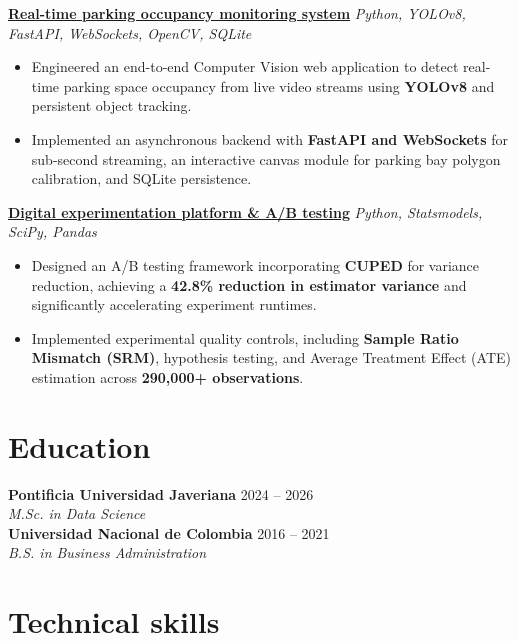 \documentclass[letterpaper,10pt]{article}
\begin{document}
\textbf{\href{https://cveram96.github.io/Portfolio/parkvision.html}{Real-time parking occupancy monitoring system}} \hfill \small{\textit{Python, YOLOv8, FastAPI, WebSockets, OpenCV, SQLite}}
\begin{itemize}
    \item Engineered an end-to-end Computer Vision web application to detect real-time parking space occupancy from live video streams using \textbf{YOLOv8} and persistent object tracking.
    \item Implemented an asynchronous backend with \textbf{FastAPI and WebSockets} for sub-second streaming, an interactive canvas module for parking bay polygon calibration, and SQLite persistence.
\end{itemize}

\vspace{0.08cm}
\textbf{\href{https://cveram96.github.io/Portfolio/ab_testing.html}{Digital experimentation platform \& A/B testing}} \hfill \small{\textit{Python, Statsmodels, SciPy, Pandas}}
\begin{itemize}
    \item Designed an A/B testing framework incorporating \textbf{CUPED} for variance reduction, achieving a \textbf{42.8\% reduction in estimator variance} and significantly accelerating experiment runtimes.
    \item Implemented experimental quality controls, including \textbf{Sample Ratio Mismatch (SRM)}, hypothesis testing, and Average Treatment Effect (ATE) estimation across \textbf{290,000+ observations}.
\end{itemize}

\section*{Education}
\textbf{Pontificia Universidad Javeriana} \hfill \small{2024 -- 2026} \\
\textsl{M.Sc. in Data Science} \\[2pt]
\textbf{Universidad Nacional de Colombia} \hfill \small{2016 -- 2021} \\
\textsl{B.S. in Business Administration}

\section*{Technical skills}
\end{document}

